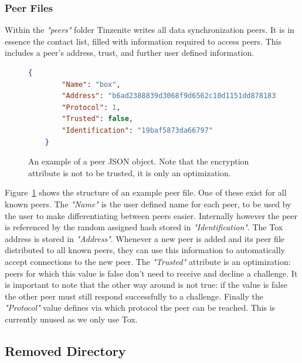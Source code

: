 \subsubsection{Peer Files}
\label{subs:Peer Files}

Within the \textit{"peers"} folder Tinzenite writes all data synchronization peers.
It is in essence the contact list, filled with information required to access peers.
This includes a peer's address, trust, and further user defined information.

\begin{figure}[htp]
    \begin{lstlisting}[language=json,firstnumber=0]
    {
        "Name": "box",
        "Address": "b6ad2388839d3068f9d6562c10d1151dd87818373c88cf9aad829144c63aac36",
        "Protocol": 1,
        "Trusted": false,
        "Identification": "19baf5873da66797"
    }
    \end{lstlisting}
\caption[Peer JSON Object]{An example of a peer JSON object. Note that the encryption attribute is not to be trusted, it is only an optimization.}
\label{json:peer_object}
\end{figure}

Figure~\ref{json:peer_object} shows the structure of an example peer file.
One of these exist for all known peers.
The \textit{"Name"} is the user defined name for each peer, to be used by the user to make differentiating between peers easier.
Internally however the peer is referenced by the random assigned hash stored in \textit{"Identification"}.
The Tox address is stored in \textit{"Address"}.
Whenever a new peer is added and its peer file distributed to all known peers, they can use this information to automatically accept connections to the new peer.
The \textit{"Trusted"} attribute is an optimization: peers for which this value is false don't need to receive and decline a challenge.
It is important to note that the other way around is not true: if the value is false the other peer must still respond successfully to a challenge.
Finally the \textit{"Protocol"} value defines via which protocol the peer can be reached.
This is currently unused as we only use Tox.

\subsection{Removed Directory}
\label{sub:Removed Directory}

